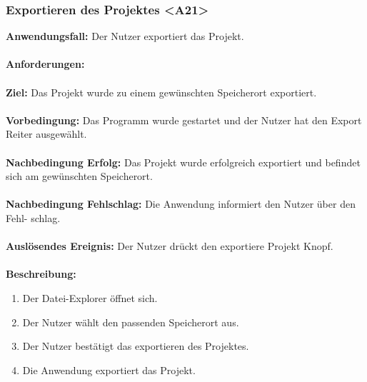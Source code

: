 \documentclass[parskip=full]{scrartcl} %
\begin{document}
\subsubsection*{Exportieren des Projektes <A21>}
\textbf{Anwendungsfall:} Der Nutzer exportiert das Projekt. \\\\
\textbf{Anforderungen:} \\\\
\textbf{Ziel:} Das Projekt wurde zu einem gewünschten Speicherort exportiert.\\\\
\textbf{Vorbedingung:} Das Programm wurde gestartet und der Nutzer hat den Export Reiter ausgewählt.\\\\
\textbf{Nachbedingung Erfolg:} Das Projekt wurde erfolgreich exportiert und befindet sich am gewünschten Speicherort.\\\\
\textbf{Nachbedingung Fehlschlag:} Die Anwendung informiert den Nutzer über den Fehl-  
schlag.\\\\
\textbf{Auslösendes Ereignis:}  Der Nutzer drückt den exportiere Projekt Knopf. \\\\
\textbf{Beschreibung:}
\begin{enumerate}
    \item Der Datei-Explorer öffnet sich.
    \item Der Nutzer wählt den passenden Speicherort aus.
    \item Der Nutzer bestätigt das exportieren des Projektes.
    \item Die Anwendung exportiert das Projekt.
\end{enumerate}
\newpage
\end{document}
